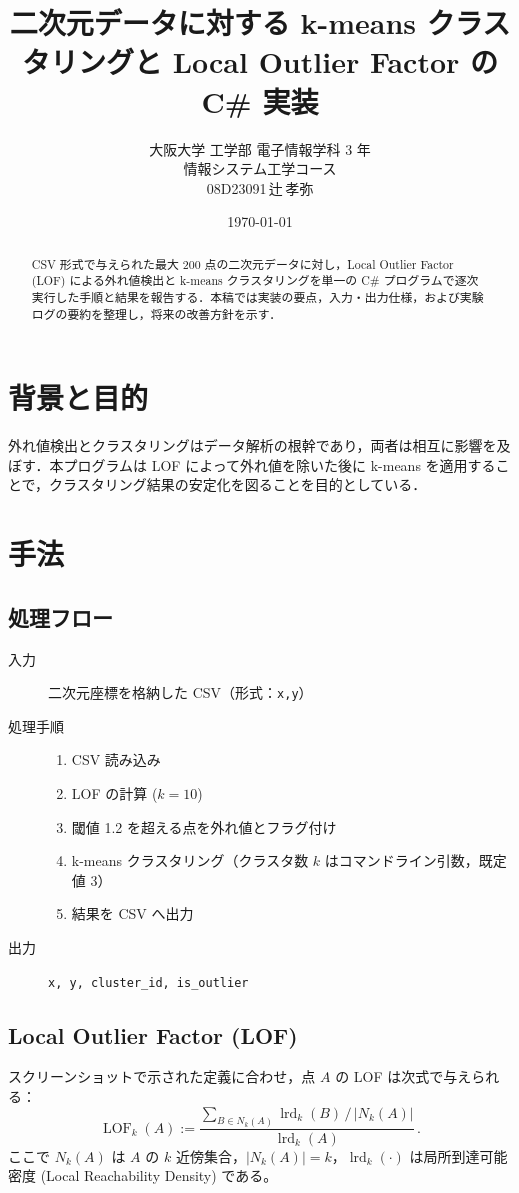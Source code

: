 \documentclass[a4j,dvipdfmx]{jsarticle}
\title{二次元データに対する k-means クラスタリングと Local Outlier Factor の C\# 実装}
\author{大阪大学 工学部 電子情報学科 3 年\\情報システム工学コース\\08D23091\,辻\,孝弥}
\date{\today}
\begin{document}
\maketitle
\tableofcontents
\newpage

\begin{abstract}
CSV 形式で与えられた最大 200 点の二次元データに対し，Local Outlier Factor (LOF) による外れ値検出と k-means クラスタリングを単一の C\# プログラムで逐次実行した手順と結果を報告する．本稿では実装の要点，入力・出力仕様，および実験ログの要約を整理し，将来の改善方針を示す．
\end{abstract}

\section{背景と目的}
外れ値検出とクラスタリングはデータ解析の根幹であり，両者は相互に影響を及ぼす．本プログラムは LOF によって外れ値を除いた後に k-means を適用することで，クラスタリング結果の安定化を図ることを目的としている．

\section{手法}
\subsection{処理フロー}
\begin{description}
  \item[入力] 二次元座標を格納した CSV（形式：\texttt{x,y}）
  \item[処理手順]
    \begin{enumerate}
      \item CSV 読み込み
      \item LOF の計算 ($k=10$)
      \item 閾値 1.2 を超える点を外れ値とフラグ付け
      \item k-means クラスタリング（クラスタ数 $k$ はコマンドライン引数，既定値 3）
      \item 結果を CSV へ出力
    \end{enumerate}
  \item[出力] \texttt{x, y, cluster\_id, is\_outlier}
\end{description}

\subsection{Local Outlier Factor (LOF)}
スクリーンショットで示された定義に合わせ，点 $A$ の LOF は次式で与えられる：
\begin{equation}
  \operatorname{LOF}_k(A)
  :=
  \frac{\sum_{B\in N_k(A)} \operatorname{lrd}_k(B) \,/\, |N_k(A)|}
       {\operatorname{lrd}_k(A)}\,.
  \label{eq:lof}
\end{equation}
ここで $N_k(A)$ は $A$ の $k$ 近傍集合，$|N_k(A)|=k$，$\operatorname{lrd}_k(\cdot)$ は局所到達可能密度 (Local Reachability Density) である。
\end{document}

